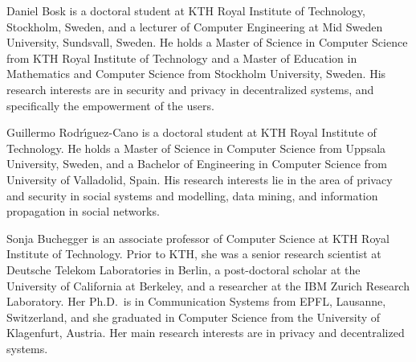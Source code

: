 \documentclass[a4paper]{llncs}
\begin{document}
Daniel Bosk is a doctoral student at KTH Royal Institute of Technology, 
Stockholm, Sweden, and a lecturer of Computer Engineering at Mid Sweden 
University, Sundsvall, Sweden.
He holds a Master of Science in Computer Science from KTH Royal Institute of 
Technology and a Master of Education in Mathematics and Computer Science from 
Stockholm University, Sweden.
His research interests are in security and privacy in decentralized systems, 
and specifically the empowerment of the users.

Guillermo Rodr\'{\i}guez-Cano is a doctoral student at KTH Royal Institute of 
Technology.
He holds a Master of Science in Computer Science from Uppsala University, 
Sweden, and a Bachelor of Engineering in Computer Science from University of 
Valladolid, Spain.
His research interests lie in the area of privacy and security in social 
systems and modelling, data mining, and information propagation in social 
networks.

Sonja Buchegger is an associate professor of Computer Science at KTH Royal 
Institute of Technology.
Prior to KTH, she was a
senior research scientist at Deutsche Telekom Laboratories in Berlin,
a post-doctoral scholar at the University of California at Berkeley,
and a researcher at the IBM Zurich Research Laboratory.
Her Ph.D.\ is in Communication Systems from EPFL, Lausanne, Switzerland, and 
she graduated in Computer Science from the University of Klagenfurt, Austria.
Her main research interests are in privacy and decentralized systems.
\end{document}
